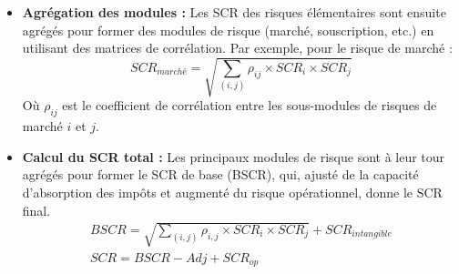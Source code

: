 \begin{itemize}
\begin{itemize}
        \item \textbf{Agrégation des modules :} Les SCR des risques élémentaires sont ensuite agrégés pour former des modules de risque (marché, souscription, etc.) en utilisant des matrices de corrélation. Par exemple, pour le risque de marché :
        \begin{equation}
            SCR_{marché} = \sqrt{\sum_{(i,j)} \rho_{ij} \times SCR_i \times SCR_j}
        \end{equation}
        Où $\rho_{ij}$ est le coefficient de corrélation entre les sous-modules de risques de marché $i$ et $j$.\newline{}
        \item \textbf{Calcul du SCR total :} Les principaux modules de risque sont à leur tour agrégés pour former le SCR de base (BSCR), qui, ajusté de la capacité d'absorption des impôts et augmenté du risque opérationnel, donne le SCR final.
        \begin{gather}
            BSCR = \sqrt{\sum_{(i,j)} \rho_{i,j} \times SCR_{i} \times SCR_{j}} + SCR_{intangible} \\
            SCR = BSCR - Adj + SCR_{op}
        \end{gather}
    \end{itemize}
\end{itemize}

